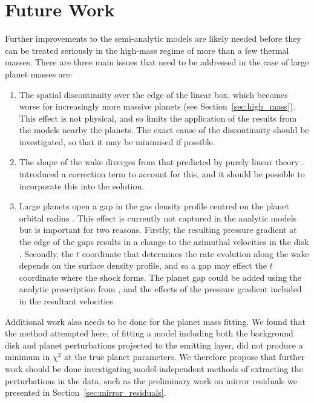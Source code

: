 \section{Future Work}

Further improvements to the semi-analytic models are likely needed before they can be treated seriously in the high-mass regime of more than a few thermal masses.
There are three main issues that need to be addressed in the case of large planet masses are:
\begin{enumerate}
    \item The spatial discontinuity over the edge of the linear box, which becomes worse for increasingly more massive planets (see Section~\ref{sec:high_mass}). This effect is not physical, and so limits the application of the results from the models nearby the planets. The exact cause of the discontinuity should be investigated, so that it may be minimised if possible.
    \item The shape of the wake diverges from that predicted by purely linear theory \citep{ogilvie2002}. \citet{cimerman2021} introduced a correction term to account for this, and it should be possible to incorporate this into the solution.
    \item Large planets open a gap in the gas density profile centred on the planet orbital radius \citep[e.g.][]{ward1997}. This effect is currently not captured in the analytic models but is important for two reasons. Firstly, the resulting pressure gradient at the edge of the gaps results in a change to the azimuthal velocities in the disk \citep{teague2018}. Secondly, the $t$ coordinate that determines the rate evolution along the wake depends on the surface density profile, and so a gap may effect the $t$ coordinate where the shock forms. The planet gap could be added using the analytic prescription from \citet{kanagawa2015}, and the effects of the pressure gradient included in the resultant velocities.
\end{enumerate}

Additional work also needs to be done for the planet mass fitting.
We found that the method attempted here, of fitting a model including both the background disk and planet perturbations projected to the emitting layer, did not produce a minimum in $\chi^2$ at the true planet parameters.
We therefore propose that further work should be done investigating model-independent methods of extracting the perturbations in the data, such as the preliminary work on mirror residuals we presented in Section~\ref{sec:mirror_residuals}.

